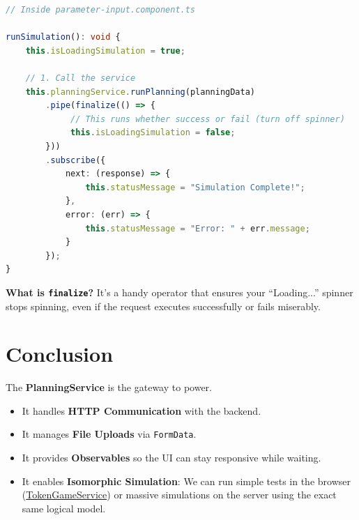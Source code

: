 \documentclass[a4paper,11pt,oneside]{report}
\begin{document}
\begin{lstlisting}[language=TypeScript]
// Inside parameter-input.component.ts

runSimulation(): void {
    this.isLoadingSimulation = true;

    // 1. Call the service
    this.planningService.runPlanning(planningData)
        .pipe(finalize(() => {
             // This runs whether success or fail (turn off spinner)
             this.isLoadingSimulation = false;
        }))
        .subscribe({
            next: (response) => {
                this.statusMessage = "Simulation Complete!";
            },
            error: (err) => {
                this.statusMessage = "Error: " + err.message;
            }
        });
}
\end{lstlisting}

\textbf{What is \texttt{finalize}?} It's a handy operator that ensures your ``Loading...'' spinner stops spinning, even if the request executes successfully or fails miserably.

\section{Conclusion}

The \textbf{PlanningService} is the gateway to power.

\begin{itemize}
    \item It handles \textbf{HTTP Communication} with the backend.
    \item It manages \textbf{File Uploads} via \texttt{FormData}.
    \item It provides \textbf{Observables} so the UI can stay responsive while waiting.
    \item It enables \textbf{Isomorphic Simulation}: We can run simple tests in the browser (\hyperref[chap:tokengame]{TokenGameService}) or massive simulations on the server using the exact same logical model.
\end{itemize}
\end{document}
